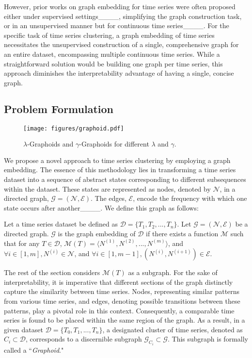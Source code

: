 However, prior works on graph embedding for time series were often proposed either under supervised settings____, simplifying the graph construction task, or in an unsupervised manner but for continuous time series____.
For the specific task of time series clustering, a graph embedding of time series necessitates the unsupervised construction of a single, comprehensive graph for an entire dataset, encompassing multiple continuous time series. While a straightforward solution would be building one graph per time series, this approach diminishes the interpretability advantage of having a single, concise graph.


\subsection{Problem Formulation}
\label{sec:Probdef}

\begin{figure}[tb]
 \centering
\texttt{[image: figures/graphoid.pdf]}

 \caption{$\lambda$-Graphoids and $\gamma$-Graphoids for different $\lambda$ and $\gamma$.}
 \label{fig:def}
\vspace{-0.3cm}
\end{figure}

We propose a novel 
approach to time series clustering by employing a graph embedding. The essence of this methodology lies in transforming a time series dataset into a sequence of abstract states corresponding to different subsequences within the dataset. These states are represented as nodes, denoted by $\mathcal{N}$, in a directed graph, $\mathcal{G}=(\mathcal{N},\mathcal{E})$. The edges, $\mathcal{E}$, encode the frequency with which one state occurs after another____. We define this graph as follows:

\begin{definition}   
Let a time series dataset be defined as $\mathcal{D} = \{T_1,T_2,...,T_n\}$. Let $\mathcal{G}=(\mathcal{N},\mathcal{E})$ be a directed graph. 
$\mathcal{G}$ is the graph embedding of $\mathcal{D}$ if there exists a function $\mathcal{M}$ such that for any $T \in \mathcal{D}$, $\mathcal{M}(T) =  \langle N^{(1)},N^{(2)},...,N^{(m)} \rangle $, and  $\forall i \in [1,m], N^{(i)} \in \mathcal{N}$, and $\forall i \in [1,m-1], (N^{(i)},N^{(i+1)}) \in \mathcal{E}$. 
\label{defGraph}  
\end{definition}

The rest of the section considers $\mathcal{M}(T)$ as a subgraph.
For the sake of interpretability, it is imperative that different sections of the graph distinctly capture the similarity between time series. Nodes, representing similar patterns from various time series, and edges, denoting possible transitions between these patterns, play a pivotal role in this context. Consequently, a comparable time series is found to be placed within the same region of the graph.
As a result, in a given dataset $\mathcal{D} = \{T_0, T_1, ..., T_n\}$, a designated cluster of time series, denoted as $C_i \subset \mathcal{D}$, corresponds to a discernible subgraph $\mathcal{G}_{C_i} \subset \mathcal{G}$. This subgraph is formally called a ``\textit{Graphoid}."


